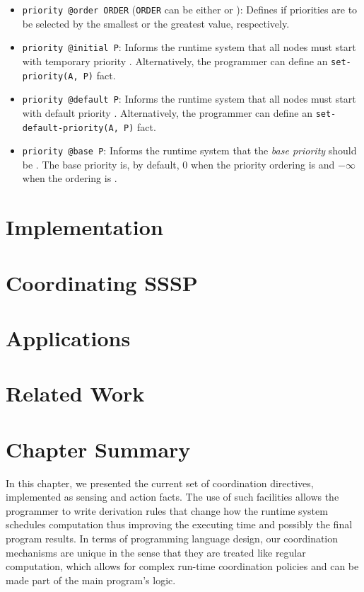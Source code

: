 \begin{itemize}

   \item \texttt{priority @order ORDER} (\texttt{ORDER} can be either 
      or ): Defines if priorities are to be selected by the smallest
      or the greatest value, respectively.

   \item \texttt{priority @initial P}: Informs the runtime system that all nodes
   must start with temporary priority . Alternatively, the programmer can define an
      \texttt{set-priority(A, P)} fact.

   \item \texttt{priority @default P}: Informs the runtime system that all nodes
      must start with default priority . Alternatively, the programmer can define an
      \texttt{set-default-priority(A, P)} fact.

   \item \texttt{priority @base P}: Informs the runtime system that the
      \emph{base priority} should be . The base priority is, by default,
      0 when the priority ordering is  and $-\infty$ when the ordering
      is .

\end{itemize}

\section{Implementation}


\section{Coordinating SSSP}


\section{Applications}



\section{Related Work}

\section{Chapter Summary}

In this chapter, we presented the current set of coordination directives,
implemented as sensing and action facts. The use of such facilities allows the
programmer to write derivation rules that change how the runtime system
schedules computation thus improving the executing time and possibly the final
program results. In terms of programming language design, our coordination
mechanisms are unique in the sense that they are treated like regular
computation, which allows for complex run-time coordination policies and can be
made part of the main program's logic.
